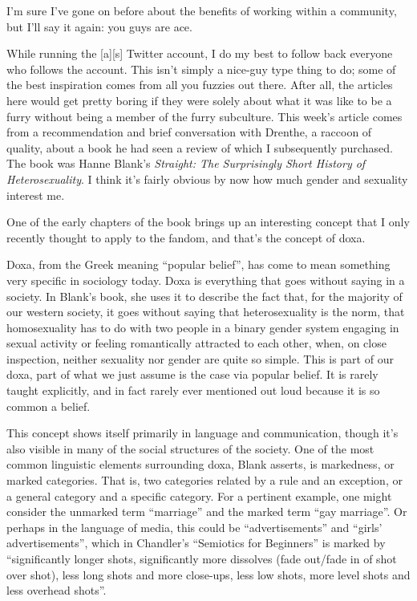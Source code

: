 
I’m sure I’ve gone on before about the benefits of working within a community, but I’ll say it again: you guys are ace.

While running the [a][s] Twitter account, I do my best to follow back everyone who follows the account.  This isn’t simply a nice-guy type thing to do; some of the best inspiration comes from all you fuzzies out there.  After all, the articles here would get pretty boring if they were solely about what it was like to be a furry without being a member of the furry subculture.  This week’s article comes from a recommendation and brief conversation with Drenthe, a raccoon of quality, about a book he had seen a review of which I subsequently purchased.  The book was Hanne Blank’s \textit{Straight: The Surprisingly Short History of Heterosexuality}.  I think it’s fairly obvious by now how much gender and sexuality interest me.

One of the early chapters of the book brings up an interesting concept that I only recently thought to apply to the fandom, and that’s the concept of doxa.

Doxa, from the Greek meaning ``popular belief'', has come to mean something very specific in sociology today.  Doxa is everything that goes without saying in a society.  In Blank’s book, she uses it to describe the fact that, for the majority of our western society, it goes without saying that heterosexuality is the norm, that homosexuality has to do with two people in a binary gender system engaging in sexual activity or feeling romantically attracted to each other, when, on close inspection, neither sexuality nor gender are quite so simple.  This is part of our doxa, part of what we just assume is the case via popular belief.  It is rarely taught explicitly, and in fact rarely ever mentioned out loud because it is so common a belief.

This concept shows itself primarily in language and communication, though it’s also visible in many of the social structures of the society.  One of the most common linguistic elements surrounding doxa, Blank asserts, is markedness, or marked categories.  That is, two categories related by a rule and an exception, or a general category and a specific category.  For a pertinent example, one might consider the unmarked term ``marriage'' and the marked term ``gay marriage''. Or perhaps in the language of media, this could be ``advertisements'' and ``girls’ advertisements'', which in Chandler’s ``Semiotics for Beginners''  is marked by ``significantly longer shots, significantly more dissolves (fade out/fade in of shot over shot), less long shots and more close-ups, less low shots, more level shots and less overhead shots''.

